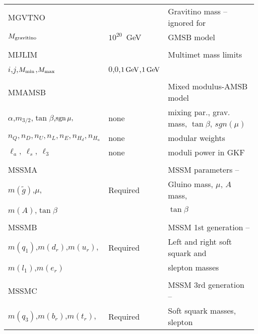 \newpage
\begin{center}
\begin{tabular}{lll}
\hline\hline
MGVTNO                 &                   & Gravitino mass -- ignored for  \\
$M_{\rm gravitino}$    & $10^{20}$~GeV     & GMSB model                     \\
                       &                   &                                \\
MIJLIM                 &                   & Multimet mass limits           \\
$i$,$j$,$M_{\rm min}$,$M_{\rm max}$ & 0,0,$1\,{\rm GeV}$,$1\,{\rm GeV}$ &             \\
                       &                   &                                \\
MMAMSB                 &                   & Mixed modulus-AMSB model       \\
$\alpha$,$m_{3/2}$,$\tan\beta$,$\mathop{\rm sgn}\mu ,$ & none & mixing par., 
grav. mass, $\tan\beta$, $sgn(\mu )$ \\
$n_Q,n_D,n_U,n_L,n_E,n_{H_d},n_{H_u}$  & none  & modular weights            \\
$\ell_a,\ \ell_s,\ \ell_3$ & none  & moduli power in GKF                    \\
                       &                   &                                \\
MSSMA                  &                   & MSSM parameters --             \\
$m(\tilde g)$,$\mu$,   & Required          & Gluino mass, $\mu$, $A$ mass,  \\
$m(A)$,$\tan\beta$     &                   & $\tan\beta$                    \\
                       &                   &                                \\
MSSMB                  &                   & MSSM 1st generation --         \\
$m(q_1)$,$m(d_r)$,$m(u_r)$, & Required     & Left and right soft squark and \\
$m(l_1)$,$m(e_r)$      &                   & slepton masses                 \\
                       &                   &                                \\
MSSMC                  &                   & MSSM 3rd generation --         \\
$m(q_3)$,$m(b_r)$,$m(t_r)$,  & Required    & Soft squark masses, slepton    \\

\end{tabular}
\end{center}
